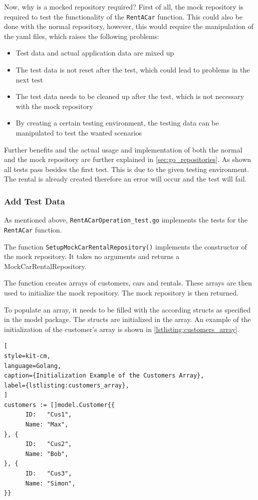 Now, why is a mocked repository required?
First of all, the mock repository is required to test the functionality of the \texttt{RentACar} function.
This could also be done with the normal repository, however, this would require the manipulation of the yaml files, which raises the following problems:
\begin{itemize}
      \item Test data and actual application data are mixed up
      \item The test data is not reset after the test, which could lead to problems in the next test
      \item The test data needs to be cleaned up after the test, which is not necessary with the mock repository
      \item By creating a certain testing environment, the testing data can be manipulated to test the wanted scenarios
\end{itemize}

Further benefits and the actual usage and implementation of both the normal and the mock repository are further explained in \autoref{sec:go_repositories}.
As shown all tests pass besides the first test.
This is due to the given testing environment.
The rental is already created therefore an error will occur and the test will fail.

\subsubsection*{Add Test Data}
As mentioned above, \texttt{RentACarOperation\_test.go} implements the tests for the \texttt{RentACar} function.

The function \texttt{SetupMockCarRentalRepository()} implements the constructor of the mock repository.
It takes no arguments and returns a MockCarRentalRepository.

The function creates arrays of customers, cars and rentals.
These arrays are then used to initialize the mock repository.
The mock repository is then returned.

To populate an array, it needs to be filled with the according structs as specified in the model package.
The structs are initialized in the array.
An example of the initialization of the customer's array is shown in \autoref{lstlisting:customers_array}.

\begin{lstlisting}[
style=kit-cm,
language=Golang,
caption={Initialization Example of the Customers Array},
label={lstlisting:customers_array},
]
customers := []model.Customer{{
      ID:   "Cus1",
      Name: "Max",
}, {
      ID:   "Cus2",
      Name: "Bob",
}, {
      ID:   "Cus3",
      Name: "Simon",
}}
\end{lstlisting}

